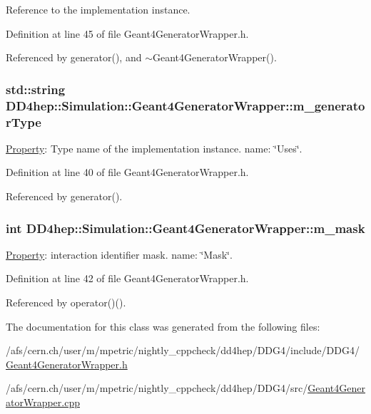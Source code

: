 Reference to the implementation instance. 

Definition at line 45 of file Geant4GeneratorWrapper.h.

Referenced by generator(), and $\sim$Geant4GeneratorWrapper().\hypertarget{class_d_d4hep_1_1_simulation_1_1_geant4_generator_wrapper_aa1ee2aa3cf2f158fe49c786af37b46f0}{
\subsubsection[{m\_\-generatorType}]{\setlength{\rightskip}{0pt plus 5cm}std::string {\bf DD4hep::Simulation::Geant4GeneratorWrapper::m\_\-generatorType}}}
\label{class_d_d4hep_1_1_simulation_1_1_geant4_generator_wrapper_aa1ee2aa3cf2f158fe49c786af37b46f0}


\hyperlink{class_d_d4hep_1_1_property}{Property}: Type name of the implementation instance. name: \char`\"{}Uses\char`\"{}. 

Definition at line 40 of file Geant4GeneratorWrapper.h.

Referenced by generator().\hypertarget{class_d_d4hep_1_1_simulation_1_1_geant4_generator_wrapper_a92bb07f3c2f7c34dc8f55290716c64b1}{
\subsubsection[{m\_\-mask}]{\setlength{\rightskip}{0pt plus 5cm}int {\bf DD4hep::Simulation::Geant4GeneratorWrapper::m\_\-mask}}}
\label{class_d_d4hep_1_1_simulation_1_1_geant4_generator_wrapper_a92bb07f3c2f7c34dc8f55290716c64b1}


\hyperlink{class_d_d4hep_1_1_property}{Property}: interaction identifier mask. name: \char`\"{}Mask\char`\"{}. 

Definition at line 42 of file Geant4GeneratorWrapper.h.

Referenced by operator()().

The documentation for this class was generated from the following files:\begin{DoxyCompactItemize}
\item 
/afs/cern.ch/user/m/mpetric/nightly\_\-cppcheck/dd4hep/DDG4/include/DDG4/\hyperlink{_geant4_generator_wrapper_8h}{Geant4GeneratorWrapper.h}\item 
/afs/cern.ch/user/m/mpetric/nightly\_\-cppcheck/dd4hep/DDG4/src/\hyperlink{_geant4_generator_wrapper_8cpp}{Geant4GeneratorWrapper.cpp}\end{DoxyCompactItemize}
